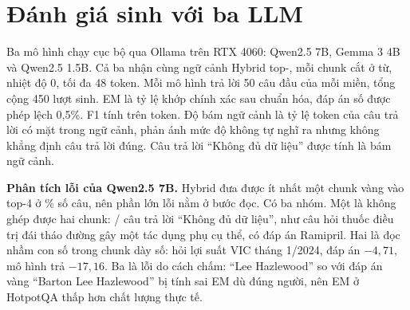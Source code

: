 \section{Đánh giá sinh với ba LLM}

Ba mô hình chạy cục bộ qua Ollama trên RTX 4060: Qwen2.5 7B, Gemma 3 4B và Qwen2.5 1.5B. Cả ba nhận cùng ngữ cảnh Hybrid top-, mỗi chunk cắt ở  từ, nhiệt độ 0, tối đa 48 token. Mỗi mô hình trả lời 50 câu đầu của mỗi miền, tổng cộng 450 lượt sinh. EM là tỷ lệ khớp chính xác sau chuẩn hóa, đáp án số được phép lệch 0,5\%. F1 tính trên token. Độ bám ngữ cảnh là tỷ lệ token của câu trả lời có mặt trong ngữ cảnh, phản ánh mức độ không tự nghĩ ra nhưng không khẳng định câu trả lời đúng. Câu trả lời ``Không đủ dữ liệu'' được tính là bám ngữ cảnh.



\textbf{Phân tích lỗi của Qwen2.5 7B.} Hybrid đưa được ít nhất một chunk vàng vào top-4 ở \% số câu, nên phần lớn lỗi nằm ở bước đọc. Có ba nhóm. Một là không ghép được hai chunk: / câu trả lời ``Không đủ dữ liệu'', như câu hỏi thuốc điều trị đái tháo đường gây một tác dụng phụ cụ thể, có đáp án Ramipril. Hai là đọc nhầm con số trong chunk dày số: hỏi lợi suất VIC tháng 1/2024, đáp án $-4{,}71$, mô hình trả $-17{,}16$. Ba là lỗi do cách chấm: ``Lee Hazlewood'' so với đáp án vàng ``Barton Lee Hazlewood'' bị tính sai EM dù đúng người, nên EM ở HotpotQA thấp hơn chất lượng thực tế.

